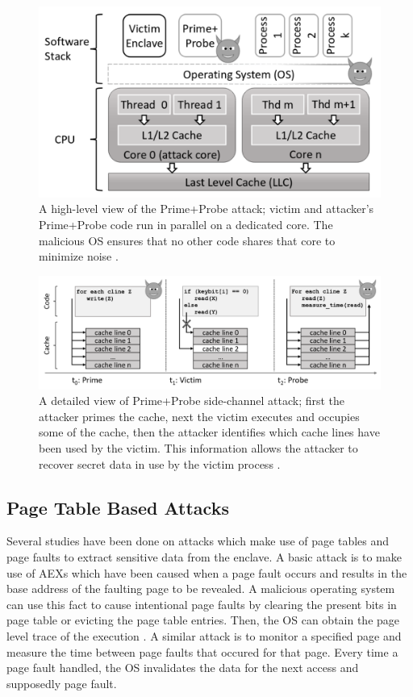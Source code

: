 \begin{figure}
	\includegraphics[scale=0.2]{images/pp1}
	\caption{A high-level view of the Prime+Probe attack; victim and attacker’s Prime+Probe code run in parallel on a dedicated core. The malicious OS  ensures  that  no  other  code shares that core to minimize noise \cite{brasser2017software}.}
	\label{fig:ppone}
\end{figure}

\begin{figure}
	\includegraphics[scale=0.2]{images/pp2}
	\caption{A detailed view of Prime+Probe side-channel attack; first the attacker primes the cache, next the victim executes and occupies some of the cache, then the attacker identifies which cache lines have been used by the victim. This information allows the attacker to recover secret data in use by the victim process \cite{brasser2017software}.}
	\label{fig:pptwo}
\end{figure}

\subsection{Page Table Based Attacks}
Several studies have been done on attacks which make use of page tables and page faults to extract sensitive data from the enclave. A basic attack is to make use of AEXs which have been caused when a page fault occurs and results in the base address of the faulting page to be revealed. A malicious operating system can use this fact to cause intentional page faults by clearing the present bits in page table or evicting the page table entries. Then, the OS can obtain the page level trace of the execution \cite{stealthy}. A similar attack is to monitor a specified page and measure the time between page faults that occured for that page. Every time a page fault handled, the OS invalidates the data for the next access and supposedly page fault.

